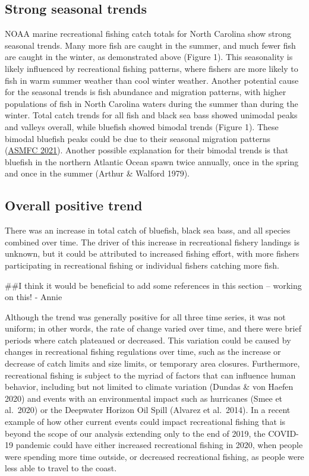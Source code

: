 \documentclass[
  12pt,
]{article}
\begin{document}
\hypertarget{strong-seasonal-trends}{%
\subsection{Strong seasonal trends}\label{strong-seasonal-trends}}

NOAA marine recreational fishing catch totals for North Carolina show
strong seasonal trends. Many more fish are caught in the summer, and
much fewer fish are caught in the winter, as demonstrated above (Figure
1). This seasonality is likely influenced by recreational fishing
patterns, where fishers are more likely to fish in warm summer weather
than cool winter weather. Another potential cause for the seasonal
trends is fish abundance and migration patterns, with higher populations
of fish in North Carolina waters during the summer than during the
winter. Total catch trends for all fish and black sea bass showed
unimodal peaks and valleys overall, while bluefish showed bimodal trends
(Figure 1). These bimodal bluefish peaks could be due to their seasonal
migration patterns (\href{http://www.asmfc.org/species/bluefish}{ASMFC
2021}). Another possible explanation for their bimodal trends is that
bluefish in the northern Atlantic Ocean spawn twice annually, once in
the spring and once in the summer (Arthur \& Walford 1979).

\hypertarget{overall-positive-trend}{%
\subsection{Overall positive trend}\label{overall-positive-trend}}

There was an increase in total catch of bluefish, black sea bass, and
all species combined over time. The driver of this increase in
recreational fishery landings is unknown, but it could be attributed to
increased fishing effort, with more fishers participating in
recreational fishing or individual fishers catching more fish.

\#\#I think it would be beneficial to add some references in this
section -- working on this! - Annie

Although the trend was generally positive for all three time series, it
was not uniform; in other words, the rate of change varied over time,
and there were brief periods where catch plateaued or decreased. This
variation could be caused by changes in recreational fishing regulations
over time, such as the increase or decrease of catch limits and size
limits, or temporary area closures. Furthermore, recreational fishing is
subject to the myriad of factors that can influence human behavior,
including but not limited to climate variation (Dundas \& von Haefen
2020) and events with an environmental impact such as hurricanes (Smee
et al.~2020) or the Deepwater Horizon Oil Spill (Alvarez et al.~2014).
In a recent example of how other current events could impact
recreational fishing that is beyond the scope of our analysis extending
only to the end of 2019, the COVID-19 pandemic could have either
increased recreational fishing in 2020, when people were spending more
time outside, or decreased recreational fishing, as people were less
able to travel to the coast.
\end{document}
